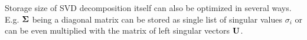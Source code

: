Storage size of SVD decomposition itself can also be optimized in several ways. E.g. $\mathbf{\Sigma}$ being a diagonal matrix can be stored as single list of singular values $\sigma_{i}$ or can be even multiplied with the matrix of left singular vectors $\mathbf{U}$.

